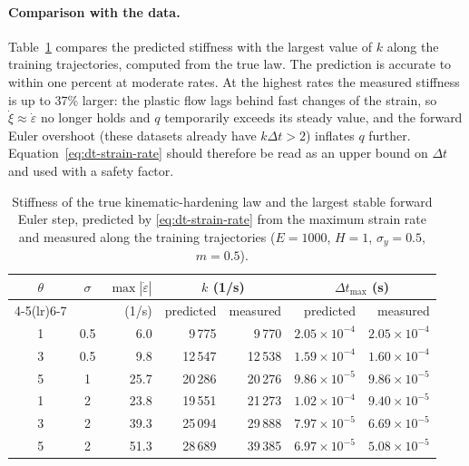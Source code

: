 \documentclass[11pt]{article}
\begin{document}
\paragraph{Comparison with the data.}
Table~\ref{tab:dt-strain-rate} compares the predicted stiffness with the
largest value of $k$ along the training trajectories, computed from the true
law. The prediction is accurate to within one percent at moderate rates. At
the highest rates the measured stiffness is up to 37\% larger: the plastic
flow lags behind fast changes of the strain, so $\dot\xi\approx\dot\varepsilon$
no longer holds and $q$ temporarily exceeds its steady value, and the
forward Euler overshoot (these datasets already have $k\Delta t>2$) inflates
$q$ further. Equation~\eqref{eq:dt-strain-rate} should therefore be read as
an upper bound on $\Delta t$ and used with a safety factor.

\begin{table}[H]
    \centering
    \begin{tabular}{cc r rr rr}
        \toprule
        $\theta$ & $\sigma$                                  & $\max|\dot\varepsilon|$
                 & \multicolumn{2}{c}{$k$ (1/s)}
                 & \multicolumn{2}{c}{$\Delta t_{\max}$ (s)}                                                                                              \\
        \cmidrule(lr){4-5}\cmidrule(lr){6-7}
                 &                                           & (1/s)                   & predicted & measured & predicted           & measured            \\
        \midrule
        1        & 0.5                                       & 6.0                     & 9\,775    & 9\,770   & $2.05\times10^{-4}$ & $2.05\times10^{-4}$ \\
        3        & 0.5                                       & 9.8                     & 12\,547   & 12\,538  & $1.59\times10^{-4}$ & $1.60\times10^{-4}$ \\
        5        & 1                                         & 25.7                    & 20\,286   & 20\,276  & $9.86\times10^{-5}$ & $9.86\times10^{-5}$ \\
        1        & 2                                         & 23.8                    & 19\,551   & 21\,273  & $1.02\times10^{-4}$ & $9.40\times10^{-5}$ \\
        3        & 2                                         & 39.3                    & 25\,094   & 29\,888  & $7.97\times10^{-5}$ & $6.69\times10^{-5}$ \\
        5        & 2                                         & 51.3                    & 28\,689   & 39\,385  & $6.97\times10^{-5}$ & $5.08\times10^{-5}$ \\
        \bottomrule
    \end{tabular}
    \caption{Stiffness of the true kinematic-hardening law and the largest
        stable forward Euler step, predicted by \eqref{eq:dt-strain-rate} from
        the maximum strain rate and measured along the training trajectories
        ($E=1000$, $H=1$, $\sigma_y=0.5$, $m=0.5$).}
    \label{tab:dt-strain-rate}
\end{table}
\end{document}
